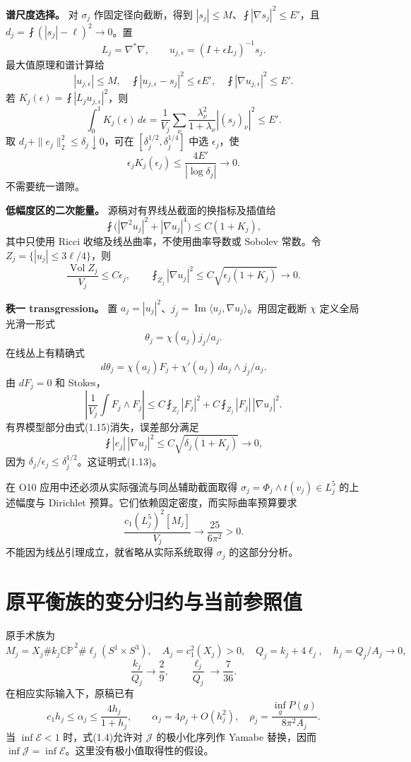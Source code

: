 \documentclass[UTF8,11pt,openany,fontset=none]{ctexbook}
\theoremstyle{definition}
\theoremstyle{remark}
\begin{document}
\textbf{谱尺度选择。} 对 \(\sigma_j\) 作固定径向截断，得到 \(|s_j|\le M\)、\(\fint|\nabla s_j|^2\le E'\)，且 \(d_j=\fint(|s_j|-\ell)^2\to0\)。置 \[
 L_j=\nabla^*\nabla,\qquad u_{j,\epsilon}=(I+\epsilon L_j)^{-1}s_j.
\] 最大值原理和谱计算给 \[
 |u_{j,\epsilon}|\le M,\quad
 \fint|u_{j,\epsilon}-s_j|^2\le\epsilon E',\quad
 \fint|\nabla u_{j,\epsilon}|^2\le E'.
\] 若 \(K_j(\epsilon)=\fint|L_ju_{j,\epsilon}|^2\)，则 \[
 \int_0^1K_j(\epsilon)\,d\epsilon
 =\frac1{V_j}\sum_\nu\frac{\lambda_\nu^2}{1+\lambda_\nu}|(s_j)_\nu|^2\le E'.
\] 取 \(d_j+\|e_j\|_2^2\le\delta_j\downarrow0\)，可在 \([\delta_j^{1/2},\delta_j^{1/4}]\) 中选 \(\epsilon_j\)，使 \[
 \epsilon_jK_j(\epsilon_j)\le\frac{4E'}{|\log\delta_j|}\to0.
\tag{1.14}
\] 不需要统一谱隙。

\textbf{低幅度区的二次能量。} 源稿对有界线丛截面的换指标及插值给 \[
 \fint\bigl(|\nabla^2u_j|^2+|\nabla u_j|^4\bigr)
 \le C(1+K_j),
\] 其中只使用 Ricci 收缩及线丛曲率，不使用曲率导数或 Sobolev 常数。令 \(Z_j=\{|u_j|\le3\ell/4\}\)，则 \[
 \frac{\operatorname{Vol}Z_j}{V_j}\le C\epsilon_j,
 \qquad
 \fint_{Z_j}|\nabla u_j|^2\le C\sqrt{\epsilon_j(1+K_j)}\to0.
\tag{1.15}
\]

\textbf{秩一 transgression。} 置 \(a_j=|u_j|^2\)、\(j_j=\operatorname{Im}\langle u_j,\nabla u_j\rangle\)。用固定截断 \(\chi\) 定义全局光滑一形式 \[
 \theta_j=\chi(a_j)j_j/a_j.
\] 在线丛上有精确式 \[
 d\theta_j=\chi(a_j)F_j+\chi'(a_j)\,da_j\wedge j_j/a_j.
\] 由 \(dF_j=0\) 和 Stokes， \[
 \left|\frac1{V_j}\int F_j\wedge F_j\right|
 \le C\fint_{Z_j}|F_j|^2
     +C\fint_{Z_j}|F_j|\,|\nabla u_j|^2.
\] 有界模型部分由式(1.15)消失，误差部分满足 \[
 \fint |e_j|\,|\nabla u_j|^2
 \le C\sqrt{\delta_j(1+K_j)}\to0,
\] 因为 \(\delta_j/\epsilon_j\le\delta_j^{1/2}\)。这证明式(1.13)。\cite{I02}

在 O10 应用中还必须从实际强流与同丛辅助截面取得 \(\sigma_j=\Phi_j\wedge t(v_j)\in L_j^5\) 的上述幅度与 Dirichlet 预算。它们依赖固定密度，而实际曲率预算要求 \[
 \frac{c_1(L_j^5)^2[M_j]}{V_j}\to\frac{25}{6\pi^2}>0.
\] 不能因为线丛引理成立，就省略从实际系统取得 \(\sigma_j\) 的这部分分析。

\section{原平衡族的变分归约与当前参照值}\label{v1-ux539fux5e73ux8861ux65cfux7684ux53d8ux5206ux5f52ux7ea6ux4e0eux5f53ux524dux53c2ux7167ux503c}

原手术族为 \[
 M_j=X_j\#k_j\overline{\mathbb{CP}}^{\,2}\#\ell_j(S^1\times S^3),
 \quad A_j=c_1^2(X_j)>0,\quad Q_j=k_j+4\ell_j,\quad h_j=Q_j/A_j\to0,
\] \[
 \frac{k_j}{Q_j}\to\frac29,\qquad \frac{\ell_j}{Q_j}\to\frac7{36}.
\] 在相应实际输入下，原稿已有 \[
 c_1h_j\le\alpha_j\le\frac{4h_j}{1+h_j},\qquad
 \alpha_j=4\rho_j+O(h_j^2),\quad
 \rho_j=\frac{\inf_gP(g)}{8\pi^2A_j}.
\tag{1.16}
\] 当 \(\inf\mathcal E<1\) 时，式(1.4)允许对 \(\mathcal J\) 的极小化序列作 Yamabe 替换，因而 \(\inf\mathcal J=\inf\mathcal E\)。这里没有极小值取得性的假设。
\end{document}

